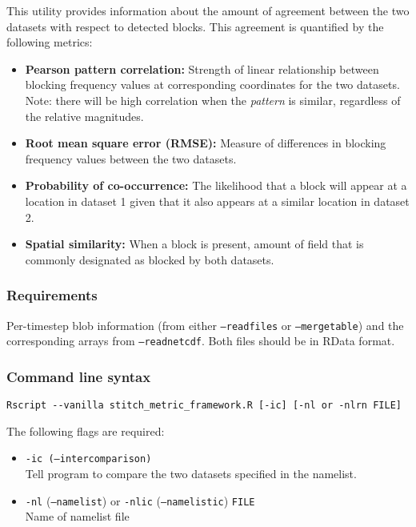 \documentclass{article}
\begin{document}
This utility  provides information about the amount of agreement between the two datasets with respect to detected blocks. This agreement is quantified by the following metrics:
\begin{itemize}
\item \textbf{ Pearson pattern correlation:} Strength of linear relationship between blocking frequency values at corresponding coordinates for the two datasets. Note: there will be high correlation when the \textit{pattern} is similar, regardless of the relative magnitudes.
\item \textbf{Root mean square error (RMSE):} Measure of differences in blocking frequency values between the two datasets.
\item \textbf{Probability of co-occurrence:} The likelihood that a block will appear at a location in dataset 1  given that it also appears at a similar location in dataset 2.
\item \textbf{Spatial similarity:} When a block is present, amount of field that is commonly designated as blocked by both datasets. 
\end{itemize}

\subsubsection{Requirements}

Per-timestep blob information (from either \texttt{--readfiles} or \texttt{--mergetable}) and the corresponding arrays from \texttt{--readnetcdf}. Both files should be in RData format.

\subsubsection{Command line syntax}
\begin{verbatim}
Rscript --vanilla stitch_metric_framework.R [-ic] [-nl or -nlrn FILE]
\end{verbatim}


The following flags are required:

\begin{itemize}
\item[] \texttt{-ic (--intercomparison)}\\Tell program to compare the two datasets specified in the namelist.
\item[]\texttt{-nl} (\texttt{--namelist}) or \texttt{-nlic} (\texttt{--namelistic}) \texttt{FILE}\\ Name of namelist file
\end{itemize}
\end{document}
